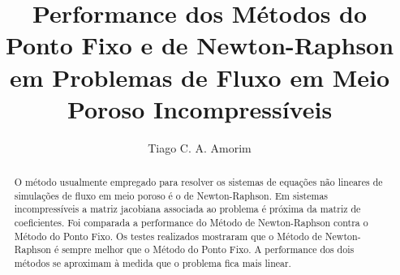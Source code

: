 \documentclass[final,5p]{elsarticle}
\numberwithin{equation}{section}
\begin{document}
\begin{frontmatter}



\title{Performance dos Métodos do Ponto Fixo e de Newton-Raphson em Problemas de Fluxo em Meio Poroso Incompressíveis}


\author{Tiago C. A. Amorim}

\begin{abstract}

    O método usualmente empregado para resolver os sistemas de equações não lineares de simulações de fluxo em meio poroso é o de Newton-Raphson. Em sistemas incompressíveis a matriz jacobiana associada ao problema é próxima da matriz de coeficientes. Foi comparada a performance do Método de Newton-Raphson contra o Método do Ponto Fixo. Os testes realizados mostraram que o Método de Newton-Raphson é sempre melhor que o Método do Ponto Fixo. A performance dos dois métodos se aproximam à medida que o problema fica mais linear.


\end{abstract}
\end{frontmatter}
\end{document}
